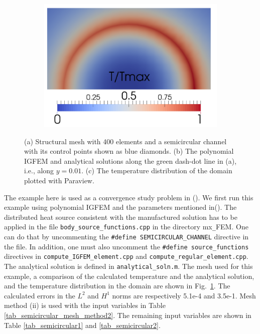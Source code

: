 \documentclass[11pt,letterpaper]{article}
\renewcommand\cite[1]{(\citet{#1})}
\begin{document}
\begin{figure}[!h]
\centering
\begin{subfigure}{0.5\textwidth}
\includegraphics[width=\linewidth]{polynomial_IGFEM_semicircular_channel_T.png}
\caption{}
\end{subfigure}
\caption{(a) Structural mesh with 400 elements and a semicircular channel with its control points shown as blue diamonds. (b) The polynomial IGFEM and analytical solutions along the green dash-dot line in (a), i.e., along $y=0.01$. (c) The temperature distribution of the domain plotted with Paraview. \label{fig_semicircular}}
\end{figure}
The example here is used as a convergence study problem in \cite{Tan15}. We first run this example using polynomial IGFEM and the parameters mentioned in\cite{Tan15}. The distributed heat source consistent with the manufactured solution has to be applied in the file \texttt{body\_source\_functions.cpp} in the directory mx\texttt{\_}FEM. One can do that by uncommenting the \texttt{\#define SEMICIRCULAR\_CHANNEL} directive in the file. In addition, one must also uncomment the  \texttt{\#define source\_functions} directives in \texttt{compute\_IGFEM\_element.cpp} and   \texttt{compute\_regular\_element.cpp}. The analytical solution is defined in \texttt{analytical\_soln.m}.   The mesh used for this example, a comparison of the calculated temperature and the analytical solution, and the temperature distribution in the domain are shown in Fig.\ \ref{fig_semicircular}. The calculated errors in the $L^2$ and $H^1$ norms are respectively 5.1e-4 and 3.5e-1. Mesh method (ii) is used with the input variables in Table \ref{tab_semicircular_mesh_method2}. The remaining input variables are shown in Table \ref{tab_semicircular1} and \ref{tab_semicircular2}. 
\end{document}
